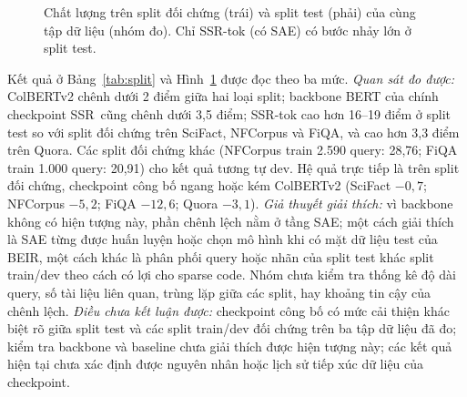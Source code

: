 \documentclass[a4paper,13pt]{extreport}
\makeatletter
\theoremstyle{plain}
\newcommand{\ssr}{SSR}
\newcommand{\ndcg}{nDCG@10}
\makeatother
\begin{document}
\begin{figure}[htbp]
\centering
{}
\caption[Chất lượng trên split đối chứng và split test (nhóm đo)]{Chất lượng trên split đối chứng (trái) và split test (phải) của cùng tập dữ liệu (nhóm đo). Chỉ \ssr-tok (có SAE) có bước nhảy lớn ở split test.}
\label{fig:split}
\end{figure}

Kết quả ở Bảng~\ref{tab:split} và Hình~\ref{fig:split} được đọc theo ba mức. \emph{Quan sát đo được:} ColBERTv2 chênh dưới 2 điểm giữa hai loại split; backbone BERT của chính checkpoint \ssr\ cũng chênh dưới 3,5 điểm; \ssr-tok cao hơn 16--19 điểm ở split test so với split đối chứng trên SciFact, NFCorpus và FiQA, và cao hơn 3,3 điểm trên Quora. Các split đối chứng khác (NFCorpus train 2.590 query: 28,76; FiQA train 1.000 query: 20,91) cho kết quả tương tự dev. Hệ quả trực tiếp là trên split đối chứng, checkpoint công bố ngang hoặc kém ColBERTv2 (SciFact $-0{,}7$; NFCorpus $-5{,}2$; FiQA $-12{,}6$; Quora $-3{,}1$). \emph{Giả thuyết giải thích:} vì backbone không có hiện tượng này, phần chênh lệch nằm ở tầng SAE; một cách giải thích là SAE từng được huấn luyện hoặc chọn mô hình khi có mặt dữ liệu test của BEIR, một cách khác là phân phối query hoặc nhãn của split test khác split train/dev theo cách có lợi cho sparse code. Nhóm chưa kiểm tra thống kê độ dài query, số tài liệu liên quan, trùng lặp giữa các split, hay khoảng tin cậy của chênh lệch. \emph{Điều chưa kết luận được:} checkpoint công bố có mức cải thiện khác biệt rõ giữa split test và các split train/dev đối chứng trên ba tập dữ liệu đã đo; kiểm tra backbone và baseline chưa giải thích được hiện tượng này; các kết quả hiện tại chưa xác định được nguyên nhân hoặc lịch sử tiếp xúc dữ liệu của checkpoint.
\end{document}
